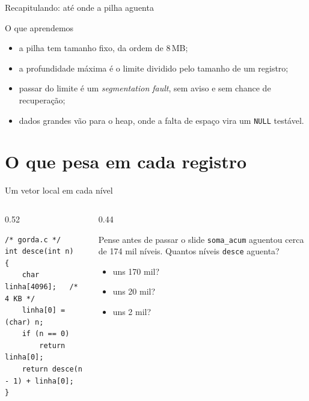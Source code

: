\documentclass[aspectratio=169]{beamer}
\begin{document}
\begin{frame}{Recapitulando: até onde a pilha aguenta}
  \begin{block}{O que aprendemos}
    \begin{itemize}
      \item a pilha tem tamanho fixo, da ordem de 8\,MB;
      \item a profundidade máxima é o limite dividido pelo tamanho de um
        registro;
      \item passar do limite é um \emph{segmentation fault}, sem aviso e
        sem chance de recuperação;
      \item dados grandes vão para o heap, onde a falta de espaço vira um
        \texttt{NULL} testável.
    \end{itemize}
  \end{block}
\end{frame}

\section{O que pesa em cada registro}

\begin{frame}[fragile]{Um vetor local em cada nível}
  \begin{columns}[c]
    \begin{column}{0.52\textwidth}
\begin{lstlisting}[style=tinyC]
/* gorda.c */
int desce(int n)
{
    char linha[4096];   /* 4 KB */
    linha[0] = (char) n;
    if (n == 0)
        return linha[0];
    return desce(n - 1) + linha[0];
}
\end{lstlisting}
    \end{column}
    \begin{column}{0.44\textwidth}
      \begin{block}{Pense antes de passar o slide}
        \small \texttt{soma\_acum} aguentou cerca de 174 mil níveis. Quantos
        níveis \texttt{desce} aguenta?
        \begin{itemize}
          \item uns 170 mil?
          \item uns 20 mil?
          \item uns 2 mil?
        \end{itemize}
      \end{block}
    \end{column}
  \end{columns}
\end{frame}
\end{document}
